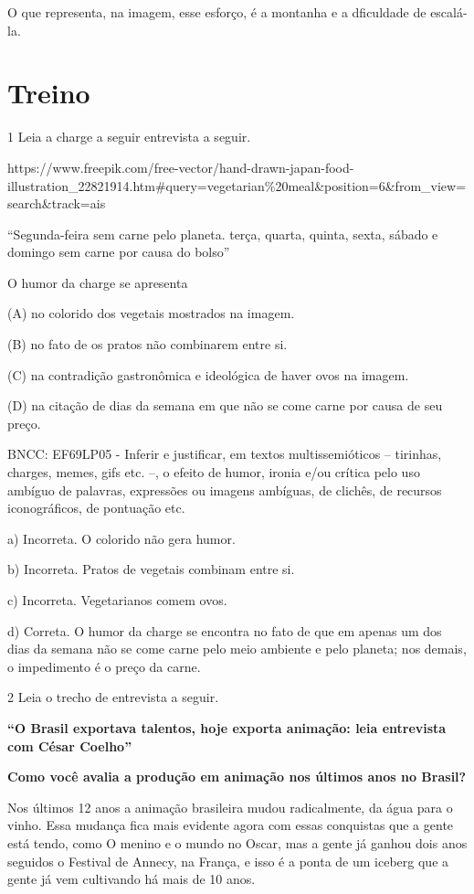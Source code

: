 \begin{itemize}
\begin{itemize}

O que representa, na imagem, esse esforço, é a montanha e a dficuldade
de escalá-la.

\section{Treino}

\num{1} Leia a charge a seguir entrevista a seguir.

https://www.freepik.com/free-vector/hand-drawn-japan-food-illustration\_22821914.htm\#query=vegetarian\%20meal\&position=6\&from\_view=search\&track=ais

``Segunda-feira sem carne pelo planeta. terça, quarta, quinta, sexta,
sábado e domingo sem carne por causa do bolso''

O humor da charge se apresenta

(A) no colorido dos vegetais mostrados na imagem.

(B) no fato de os pratos não combinarem entre si.

(C) na contradição gastronômica e ideológica de haver ovos na imagem.

(D) na citação de dias da semana em que não se come carne por causa de
seu preço.

BNCC: EF69LP05 - Inferir e justificar, em textos multissemióticos --
tirinhas, charges, memes, gifs etc. --, o efeito de humor, ironia e/ou
crítica pelo uso ambíguo de palavras, expressões ou imagens ambíguas, de
clichês, de recursos iconográficos, de pontuação etc.

a) Incorreta. O colorido não gera humor.

b) Incorreta. Pratos de vegetais combinam entre si.

c) Incorreta. Vegetarianos comem ovos.

d) Correta. O humor da charge se encontra no fato de que em apenas um
dos dias da semana não se come carne pelo meio ambiente e pelo planeta;
nos demais, o impedimento é o preço da carne.

\num{2} Leia o trecho de entrevista a seguir.

\textbf{``O Brasil exportava talentos, hoje exporta animação: leia
entrevista com César Coelho''}

\textbf{Como você avalia a produção em animação nos últimos anos no
Brasil?}

Nos últimos 12 anos a animação brasileira mudou radicalmente, da água
para o vinho. Essa mudança fica mais evidente agora com essas conquistas
que a gente está tendo, como O menino e o mundo no Oscar, mas a gente já
ganhou dois anos seguidos o Festival de Annecy, na França, e isso é a
ponta de um iceberg que a gente já vem cultivando há mais de 10 anos.


\end{itemize}
\end{itemize}
